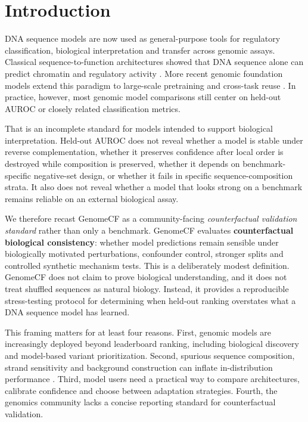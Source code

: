 \documentclass[11pt]{article}
\begin{document}
\section{Introduction}
DNA sequence models are now used as general-purpose tools for regulatory classification, biological interpretation and transfer across genomic assays. Classical sequence-to-function architectures showed that DNA sequence alone can predict chromatin and regulatory activity \citep{zhou2015deepsea,kelley2016basset,kelley2018basenji,zhou2018expecto,avsec2021enformer}. More recent genomic foundation models extend this paradigm to large-scale pretraining and cross-task reuse \citep{ji2021dnabert,zhou2024dnabert2,nguyen2023hyenadna,schiff2024caduceus,dallatorre2025nt}. In practice, however, most genomic model comparisons still center on held-out AUROC or closely related classification metrics.

That is an incomplete standard for models intended to support biological interpretation. Held-out AUROC does not reveal whether a model is stable under reverse complementation, whether it preserves confidence after local order is destroyed while composition is preserved, whether it depends on benchmark-specific negative-set design, or whether it fails in specific sequence-composition strata. It also does not reveal whether a model that looks strong on a benchmark remains reliable on an external biological assay.

We therefore recast GenomeCF as a community-facing \emph{counterfactual validation standard} rather than only a benchmark. GenomeCF evaluates \textbf{counterfactual biological consistency}: whether model predictions remain sensible under biologically motivated perturbations, confounder control, stronger splits and controlled synthetic mechanism tests. This is a deliberately modest definition. GenomeCF does not claim to prove biological understanding, and it does not treat shuffled sequences as natural biology. Instead, it provides a reproducible stress-testing protocol for determining when held-out ranking overstates what a DNA sequence model has learned.

This framing matters for at least four reasons. First, genomic models are increasingly deployed beyond leaderboard ranking, including biological discovery and model-based variant prioritization. Second, spurious sequence composition, strand sensitivity and background construction can inflate in-distribution performance \citep{geirhos2020shortcut,krutzfeldt2020negative}. Third, model users need a practical way to compare architectures, calibrate confidence and choose between adaptation strategies. Fourth, the genomics community lacks a concise reporting standard for counterfactual validation.
\end{document}
